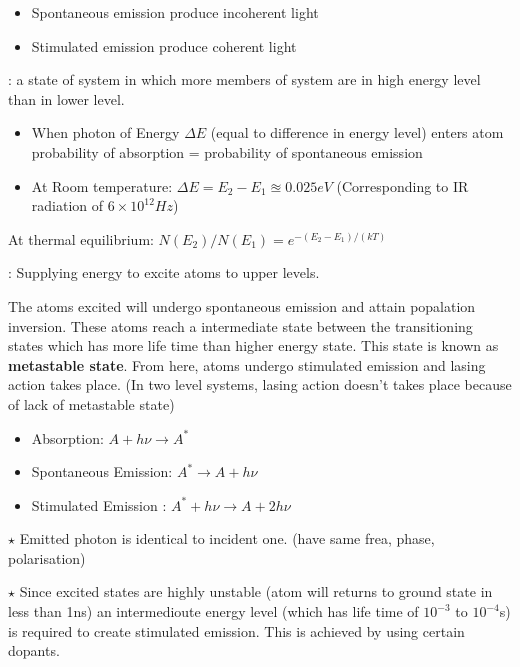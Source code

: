 \documentclass[12pt, a4paper]{article}
\begin{document}
\begin{itemize}
	\item Spontaneous emission produce incoherent light
	\item Stimulated emission produce coherent light
\end{itemize}

: a state of system in which more members of system are in high energy level than in lower level.
\begin{itemize}
	\item When photon of Energy $\Delta E$ (equal to difference in energy level) enters atom\\
	      probability of absorption = probability of spontaneous emission
	\item At Room temperature: $\Delta E = E_2-E_1 \approxeq 0.025 \unit{eV}$ (Corresponding to IR radiation of $6 \times 10^{12} \unit{Hz}$)
\end{itemize}



At thermal equilibrium: $N\left(E_2\right) / N\left(E_1\right)=e ^ {-\left(E_2-E_1\right) / (kT)}$
\medskip

: Supplying energy to excite atoms to upper levels.


The atoms excited will undergo spontaneous emission and attain popalation inversion. These atoms reach a intermediate state between the transitioning states which has more life time than higher energy state. This state is known as \textbf{metastable state}. From here, atoms undergo stimulated emission and lasing action takes place. (In two level systems, lasing action doesn't takes place because of lack of metastable state)


\begin{itemize}
	\item Absorption: $A+h\nu \rightarrow A^{*}$
	\item Spontaneous Emission: $A^{*} \rightarrow A+h\nu$
	\item Stimulated Emission : $A^{*}+h\nu \rightarrow A+2 h\nu$
\end{itemize}
$\star$ Emitted photon is identical to incident one. (have same frea, phase, polarisation)

$\star$ Since excited states are highly unstable (atom will returns to ground state in less than 1ns) an intermedioute energy level (which has life time of $10^{-3}$ to $10^{-4}$s) is required to create stimulated emission. This is achieved by using certain dopants.
\end{document}
